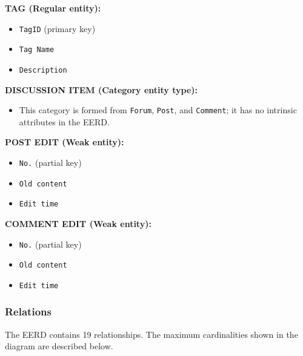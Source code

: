 \noindent\textbf{TAG (Regular entity):}
\begin{itemize}
    \item \texttt{TagID} (primary key)
    \item \texttt{Tag Name}
    \item \texttt{Description}
\end{itemize}

\noindent\textbf{DISCUSSION ITEM (Category entity type):}
\begin{itemize}
    \item This category is formed from \texttt{Forum}, \texttt{Post}, and \texttt{Comment}; it has no intrinsic attributes in the EERD.
\end{itemize}

\noindent\textbf{POST EDIT (Weak entity):}
\begin{itemize}
    \item \texttt{No.} (partial key)
    \item \texttt{Old content}
    \item \texttt{Edit time}
\end{itemize}

\noindent\textbf{COMMENT EDIT (Weak entity):}
\begin{itemize}
    \item \texttt{No.} (partial key)
    \item \texttt{Old content}
    \item \texttt{Edit time}
\end{itemize}

\subsubsection{Relations}

The EERD contains 19 relationships. The maximum cardinalities shown in the
diagram are described below.

